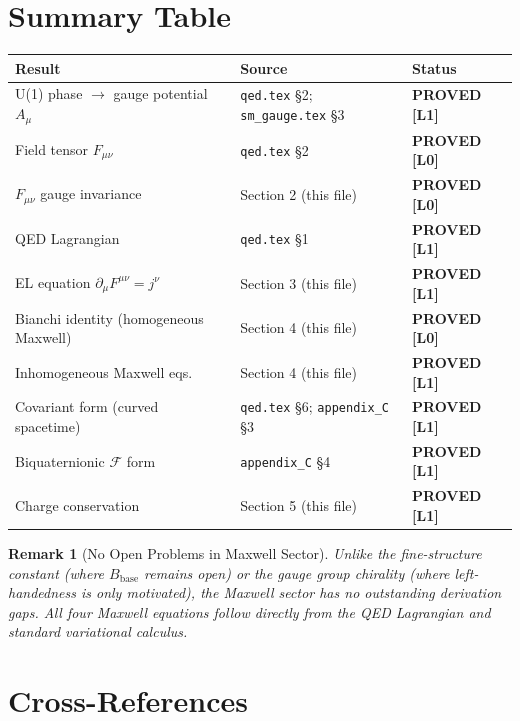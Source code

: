 \documentclass[11pt,a4paper]{article}
\newtheorem{remark}{Remark}
\newcommand{\Lzero}{\textbf{[L0]}}
\newcommand{\Lone}{\textbf{[L1]}}
\newcommand{\PROVED}{\textbf{PROVED}}
\newcommand{\Bbase}{B_{\mathrm{base}}}
\begin{document}
\section{Summary Table}

\begin{center}
\begin{tabular}{lll}
\hline
\textbf{Result} & \textbf{Source} & \textbf{Status} \\
\hline
U(1) phase $\to$ gauge potential $A_\mu$ & \texttt{qed.tex} \S2; \texttt{sm\_gauge.tex} \S3 & \PROVED{} \Lone \\
Field tensor $F_{\mu\nu}$ & \texttt{qed.tex} \S2 & \PROVED{} \Lzero \\
$F_{\mu\nu}$ gauge invariance & Section 2 (this file) & \PROVED{} \Lzero \\
QED Lagrangian & \texttt{qed.tex} \S1 & \PROVED{} \Lone \\
EL equation $\partial_\mu F^{\mu\nu} = j^\nu$ & Section 3 (this file) & \PROVED{} \Lone \\
Bianchi identity (homogeneous Maxwell) & Section 4 (this file) & \PROVED{} \Lzero \\
Inhomogeneous Maxwell eqs.\ & Section 4 (this file) & \PROVED{} \Lone \\
Covariant form (curved spacetime) & \texttt{qed.tex} \S6; \texttt{appendix\_C} \S3 & \PROVED{} \Lone \\
Biquaternionic $\mathcal{F}$ form & \texttt{appendix\_C} \S4 & \PROVED{} \Lone \\
Charge conservation & Section 5 (this file) & \PROVED{} \Lone \\
\hline
\end{tabular}
\end{center}

\begin{remark}[No Open Problems in Maxwell Sector]
Unlike the fine-structure constant (where $\Bbase$ remains open) or the
gauge group chirality (where left-handedness is only motivated), the Maxwell
sector has no outstanding derivation gaps. All four Maxwell equations follow
directly from the QED Lagrangian and standard variational calculus.
\end{remark}

\section{Cross-References}
\end{document}
